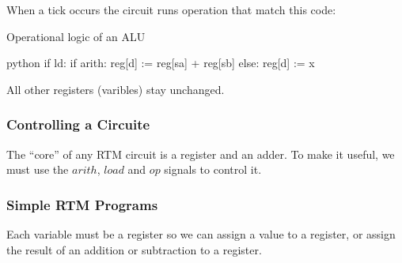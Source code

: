 \noindent
When a tick occurs the circuit runs operation that match this code:
\begin{highlight}{Operational logic of an ALU}
	\begin{code}{python}
		if ld:
		if arith:
		reg[d] := reg[sa] + reg[sb]
		else:
		reg[d] := x
	\end{code}
\end{highlight}
%
All other registers (varibles) stay unchanged.

\subsubsection{Controlling a Circuite}\label{ssub:controlling_a_circuite}

The ``core'' of any RTM circuit is a register and an adder.
To make it useful, we must use the \(arith\), \(load\) and \(op\) signals to control it.

\subsubsection{Simple RTM Programs}\label{ssub:simple_rtm_programs}

Each variable must be a register so we can assign a value to a register, or assign the result of an addition or subtraction to a register.
